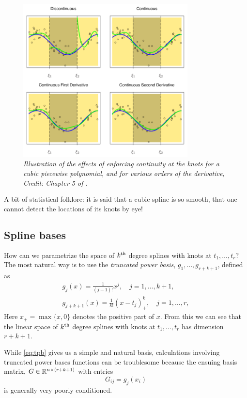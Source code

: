 \documentclass{article}
\begin{document}
\begin{figure}[tb]
\centering
\includegraphics[width=0.8\textwidth]{splines.pdf}
\caption{\it Illustration of the effects of enforcing continuity at the knots
  for a cubic piecewise polynomial, and for various orders of the derivative,
  Credit: Chapter 5 of \citet{hastie2009elements}.}    
\label{fig:splines}
\end{figure}

A bit of statistical folklore: it is said that a cubic spline is so smooth, that
one cannot detect the locations of its knots by eye! 

\subsection{Spline bases}

How can we parametrize the space of $k^{\text{th}}$ degree splines with knots at 
$t_1,\dots,t_r$?  The most natural way is to use the \emph{truncated power
  basis}, $g_1, \dots, g_{r+k+1}$, defined as   
\begin{equation}
\begin{gathered}
\label{eq:tpb}
g_j(x) = \frac{1}{(j-1)!} x^j, \quad j=1,\dots,k+1, \\
g_{j+k+1}(x) = \frac{1}{k!} (x-t_j)^k_+, \quad j=1,\dots,r,
\end{gathered}
\end{equation}
Here $x_+=\max\{x,0\}$ denotes the positive part of $x$. From this we can see
that the linear space of $k^{\text{th}}$ degree splines with knots at $t_1,\dots,t_r$ has 
dimension $r+k+1$.

While \eqref{eq:tpb} gives us a simple and natural basis, calculations involving
truncated power bases functions can be troublesome because the ensuing basis 
matrix, $G \in \mathbb{R}^{n \times (r+k+1)}$ with entries
\[
G_{ij} = g_j(x_i)
\]
is generally very poorly conditioned.
\end{document}
